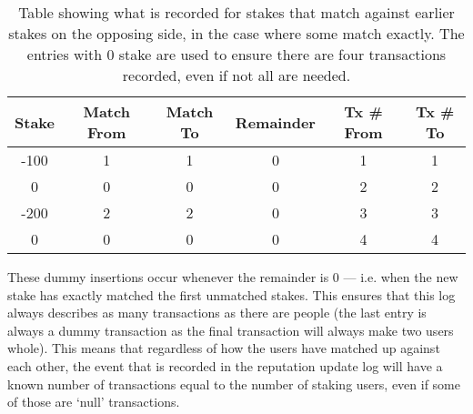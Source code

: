 \begin{table}[ht]
\centering
\caption{Table showing what is recorded for stakes that match against earlier stakes on the opposing side, in the case where some match exactly. The entries with 0 stake are used to ensure there are four transactions recorded, even if not all are needed.}
\label{tab:matchFromTo}
\begin{tabular}{|c|c|c|c|c|c|}
\hline
Stake & Match From & Match To & Remainder & Tx \# From & Tx \# To \\ \hline
-100  & 1          & 1        & 0   & 1 & 1     \\ \hline
 0 & 0          & 0        & 0      & 2 & 2   \\ \hline
-200 & 2          & 2        & 0    & 3 & 3    \\ \hline
 0 & 0          & 0        & 0      & 4 & 4   \\ \hline
\end{tabular}
\end{table}

These dummy insertions occur whenever the remainder is 0 --- i.e. when the new stake has exactly matched the first unmatched stakes. This ensures that this log always describes as many transactions as there are people (the last entry is always a dummy transaction as the final transaction will always make two users whole). This means that regardless of how the users have matched up against each other, the event that is recorded in the reputation update log will have a known number of transactions equal to the number of staking users, even if some of those are `null' transactions.

